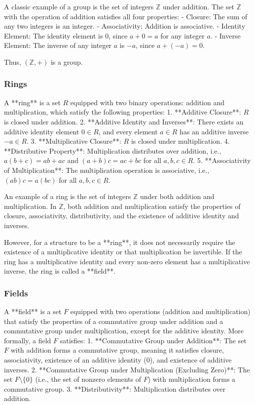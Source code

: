\documentclass{article}
\begin{document}
A classic example of a group is the set of integers \( \mathbb{Z} \) under addition. The set \( \mathbb{Z} \) with the operation of addition satisfies all four properties:
- Closure: The sum of any two integers is an integer.
- Associativity: Addition is associative.
- Identity Element: The identity element is \( 0 \), since \( a + 0 = a \) for any integer \( a \).
- Inverse Element: The inverse of any integer \( a \) is \( -a \), since \( a + (-a) = 0 \).

Thus, \( (\mathbb{Z}, +) \) is a group.

\subsubsection*{Rings}

A **ring** is a set \( R \) equipped with two binary operations: addition and multiplication, which satisfy the following properties:
1. **Additive Closure**: \( R \) is closed under addition.
2. **Additive Identity and Inverses**: There exists an additive identity element \( 0 \in R \), and every element \( a \in R \) has an additive inverse \( -a \in R \).
3. **Multiplicative Closure**: \( R \) is closed under multiplication.
4. **Distributive Property**: Multiplication distributes over addition, i.e., \( a(b + c) = ab + ac \) and \( (a + b)c = ac + bc \) for all \( a, b, c \in R \).
5. **Associativity of Multiplication**: The multiplication operation is associative, i.e., \( (ab)c = a(bc) \) for all \( a, b, c \in R \).

An example of a ring is the set of integers \( \mathbb{Z} \) under both addition and multiplication. In \( \mathbb{Z} \), both addition and multiplication satisfy the properties of closure, associativity, distributivity, and the existence of additive identity and inverses.

However, for a structure to be a **ring**, it does not necessarily require the existence of a multiplicative identity or that multiplication be invertible. If the ring has a multiplicative identity and every non-zero element has a multiplicative inverse, the ring is called a **field**.

\subsubsection*{Fields}

A **field** is a set \( F \) equipped with two operations (addition and multiplication) that satisfy the properties of a commutative group under addition and a commutative group under multiplication, except for the additive identity. More formally, a field \( F \) satisfies:
1. **Commutative Group under Addition**: The set \( F \) with addition forms a commutative group, meaning it satisfies closure, associativity, existence of an additive identity (0), and existence of additive inverses.
2. **Commutative Group under Multiplication (Excluding Zero)**: The set \( F \setminus \{0\} \) (i.e., the set of nonzero elements of \( F \)) with multiplication forms a commutative group.
3. **Distributivity**: Multiplication distributes over addition.
\end{document}
